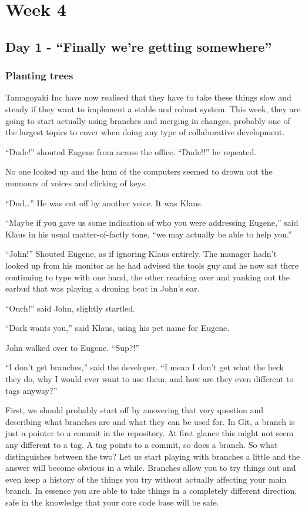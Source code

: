 \cleardoublepage
\chapter{Week 4}
\section{Day 1 - ``Finally we're getting somewhere''}
\subsection{Planting trees}

Tamagoyaki Inc have now realised that they have to take these things slow and steady if they want to implement a stable and robust system.  This week, they are going to start actually using branches and merging in changes, probably one of the largest topics to cover when doing any type of collaborative development.  

\begin{trenches}
``Dude!'' shouted Eugene from across the office.  ``Dude!!'' he repeated.

No one looked up and the hum of the computers seemed to drown out the mumours of voices and clicking of keys.  

``Dud\ldots'' He was cut off by another voice.  It was Klaus.

``Maybe if you gave us some indication of who you were addressing Eugene,'' said Klaus in his usual matter-of-factly tone, ``we may actually be able to help you.''  

``John!''  Shouted Eugene, as if ignoring Klaus entirely.  The manager hadn't looked up from his monitor as he had advised the tools guy and he now sat there continuing to type with one hand, the other reaching over and yanking out the earbud that was playing a droning beat in John's ear.

``Ouch!'' said John, slightly startled.

``Dork wants you,'' said Klaus, using his pet name for Eugene.  

John walked over to Eugene.  ``Sup?!''

``I don't get branches,'' said the developer.  ``I mean I don't get what the heck they do, why I would ever want to use them, and how are they even different to tags anyway?''
\end{trenches}

First, we should probably start off by answering that very question and describing what branches are and what they can be used for.  In Git, a branch is just a pointer to a commit in the repository.  At first glance this might not seem any different to a tag.  A tag points to a commit, so does a branch.  So what distinguishes between the two?  Let us start playing with branches a little and the answer will become obvious in a while.  Branches allow you to try things out and even keep a history of the things you try without actually affecting your main branch.  In essence you are able to take things in a completely different direction, safe in the knowledge that your core code base will be safe.

